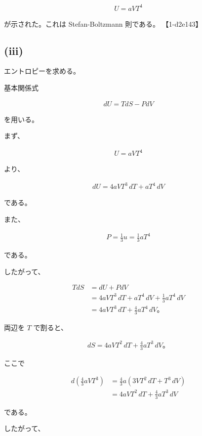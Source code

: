 \documentclass[platex,dvipdfmx,a4paper]{jsarticle}
\begin{document}
\begin{align*}
U=aVT^4
\end{align*}

が示された。これは Stefan-Boltzmann 則である。 【1-d2e143】

\subsection{(iii)}

エントロピーを求める。

基本関係式

\begin{align*}
dU
=
TdS-PdV
\end{align*}

を用いる。

まず、

\begin{align*}
U=aVT^4
\end{align*}

より、

\begin{align*}
dU
=
4aVT^3\,dT
+
aT^4\,dV
\end{align*}

である。

また、

\begin{align*}
P=\frac13u
=
\frac13aT^4
\end{align*}

である。

したがって、

\begin{align*}
TdS
&=
dU+PdV \\
&=
4aVT^3\,dT
+
aT^4\,dV
+
\frac13aT^4\,dV \\
&=
4aVT^3\,dT
+
\frac43aT^4\,dV。
\end{align*}

両辺を $T$ で割ると、

\begin{align*}
dS
=
4aVT^2\,dT
+
\frac43aT^3\,dV。
\end{align*}

ここで

\begin{align*}
d
\left(
\frac43aVT^3
\right)
&=
\frac43a
\left(
3VT^2\,dT
+
T^3\,dV
\right) \\
&=
4aVT^2\,dT
+
\frac43aT^3\,dV
\end{align*}

である。

したがって、
\end{document}
